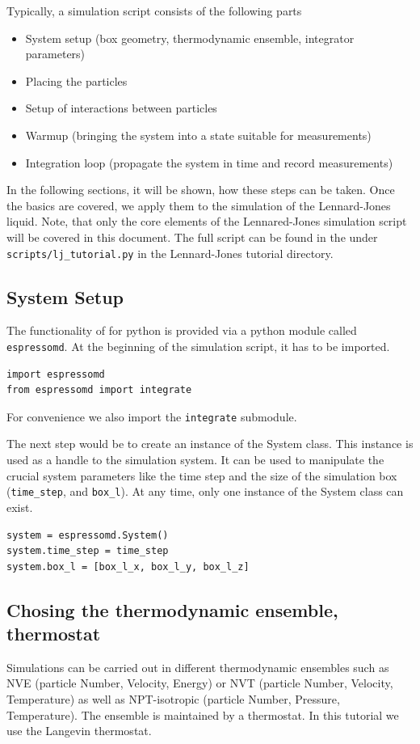 \documentclass[
paper=a4,                       %
fontsize=11pt,                  %
twoside,                        %
footsepline,                    %
headsepline,                    %
headinclude=false,              %
footinclude=false,              %
pagesize,                       %
]{scrartcl}
\begin{document}
Typically, a simulation script consists of the following parts
\begin{itemize}
\item System setup (box geometry, thermodynamic ensemble, integrator parameters)
\item Placing the particles
\item Setup of interactions between particles
\item Warmup (bringing the system into a state suitable for measurements)
\item Integration loop (propagate the system in time and record measurements)
\end{itemize}
In the following sections, it will be shown, how these steps can be taken. Once the basics are covered, we apply them to the simulation of the Lennard-Jones liquid.
Note, that only the core elements of the Lennared-Jones simulation script will be covered in this document. The full script can be found in the under \verb+scripts/lj_tutorial.py+ in the Lennard-Jones tutorial directory.


\subsection{System Setup}
The functionality of \es{} for
python is provided via a python module called
\texttt{espressomd}. At the beginning of the simulation script, it has to be imported.
\begin{lstlisting}
import espressomd
from espressomd import integrate
\end{lstlisting}
For convenience we also import the \texttt{integrate} submodule. 

The next step would be to create an instance of the System class. 
This instance is used as a handle to the simulation system. It can be used to manipulate the
crucial system parameters like the time step and the size of the simulation box (\texttt{time\_step}, and \texttt{box\_l}). At any time, only one instance of the System class can exist.
\begin{lstlisting}
system = espressomd.System()
system.time_step = time_step
system.box_l = [box_l_x, box_l_y, box_l_z]
\end{lstlisting}
\subsection{Chosing the thermodynamic ensemble, thermostat}
Simulations can be carried out in different thermodynamic ensembles such as NVE (particle
Number, Velocity, Energy) or NVT (particle Number, Velocity, Temperature)
as well as NPT-isotropic (particle Number, Pressure, Temperature). 
The ensemble is maintained by a thermostat. In this tutorial we use the Langevin thermostat.
\end{document}
